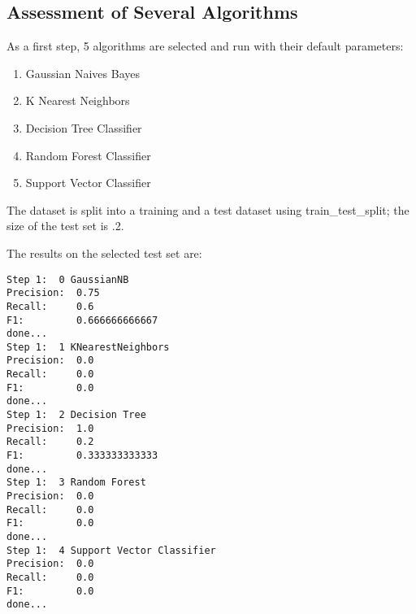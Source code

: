 \documentclass[11pt]{article} %
\begin{document}
\subsection{Assessment of Several Algorithms}
As a first step, 5 algorithms are selected and run with their default parameters:
\begin{enumerate}
\item Gaussian Naives Bayes
\item K Nearest Neighbors
\item Decision Tree Classifier
\item Random Forest Classifier
\item Support Vector Classifier
\end{enumerate}

The dataset is split into a training and a test dataset using {\selectfont train\_test\_split}; the size of the test set is .2.\medskip

The results on the selected test set are:
\begin{verbatim}
Step 1:  0 GaussianNB
Precision:  0.75
Recall:     0.6
F1:         0.666666666667
done...
Step 1:  1 KNearestNeighbors
Precision:  0.0
Recall:     0.0
F1:         0.0
done...
Step 1:  2 Decision Tree
Precision:  1.0
Recall:     0.2
F1:         0.333333333333
done...
Step 1:  3 Random Forest
Precision:  0.0
Recall:     0.0
F1:         0.0
done...
Step 1:  4 Support Vector Classifier
Precision:  0.0
Recall:     0.0
F1:         0.0
done...
\end{verbatim}
\end{document}
